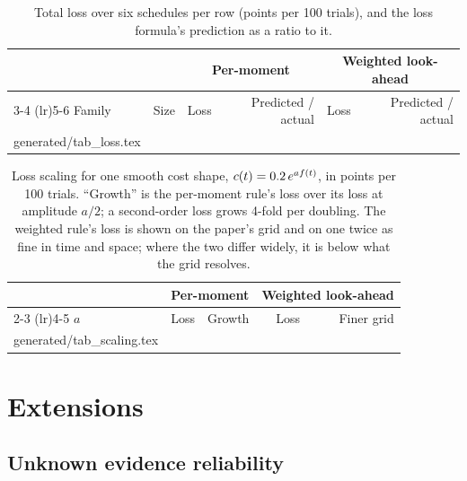 \documentclass[11pt]{article}
\makeatletter
\newcommand\inputrows[1]{\@@input #1 }
\theoremstyle{definition}
\theoremstyle{remark}
\makeatother
\begin{document}
\begin{table}[t]
  \centering
  \caption{Total loss over six schedules per row (points per 100 trials), and the loss formula's
    prediction as a ratio to it.}
  \label{tab:loss}
  \begin{tabular}{llrrrr}
    \toprule
    & & \multicolumn{2}{c}{Per-moment} & \multicolumn{2}{c}{Weighted look-ahead} \\
    \cmidrule(lr){3-4} \cmidrule(lr){5-6}
    Family & Size & Loss & Predicted / actual & Loss & Predicted / actual \\
    \midrule
    \inputrows{generated/tab_loss.tex}
    \bottomrule
  \end{tabular}
\end{table}

\begin{table}[t]
  \centering
    \caption{Loss scaling for one smooth cost shape, $c(t) = 0.2\,e^{a f(t)}$, in points per
    100 trials. ``Growth'' is the per-moment rule's loss over its loss at amplitude $a/2$; a
    second-order loss grows 4-fold per doubling. The weighted rule's loss is shown on the paper's
    grid and on one twice as fine in time and space; where the two differ widely, it is below what
    the grid resolves.}
  \label{tab:scaling}
  \begin{tabular}{lrrrr}
    \toprule
        & \multicolumn{2}{c}{Per-moment} & \multicolumn{2}{c}{Weighted look-ahead} \\
    \cmidrule(lr){2-3} \cmidrule(lr){4-5}
    $a$ & Loss & Growth & Loss & Finer grid \\
    \midrule
    \inputrows{generated/tab_scaling.tex}
    \bottomrule
  \end{tabular}
\end{table}

\section{Extensions}
\label{sec:extensions}

\subsection{Unknown evidence reliability}
\end{document}
